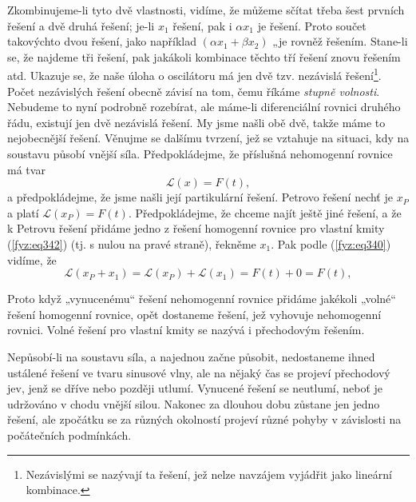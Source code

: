 {    
    Zkombinujeme-li tyto dvě vlastnosti, vidíme, že můžeme sčítat třeba šest prvních řešení a dvě 
    druhá řešení; je-li \(x_1\) řešení, pak i \(\alpha x_1\) je řešení. Proto součet takovýchto 
    dvou řešení, jako například \((\alpha x_1 + \beta x_2 )\) „je rovněž řešením. Stane-li se, že 
    najdeme tři řešení, pak jakákoli kombinace těchto tří řešení znovu řešením atd. Ukazuje se, že 
    naše úloha o oscilátoru má jen dvě tzv. nezávislá řešení\footnote{Nezávislými se nazývají ta 
    řešení, jež nelze navzájem vyjádřit jako lineární kombinace.}. Počet nezávislých řešení obecně 
    závisí na tom, čemu říkáme \emph{stupně volnosti}. Nebudeme to nyní podrobně rozebírat, ale 
    máme-li diferenciální rovnici druhého řádu, existují jen dvě nezávislá řešení. My jsme našli 
    obě dvě, takže máme to nejobecnější řešení. Věnujme se dalšímu tvrzení, jež se vztahuje na 
    situaci, kdy na soustavu působí vnější síla. Předpokládejme, že příslušná nehomogenní rovnice 
    má tvar
    \begin{equation}\label{fyz:eq343}
      \mathscr{L}(x) = F(t),
    \end{equation}
    a předpokládejme, že jsme našli její partikulární řešení. Petrovo řešení nechť je \(x_P\) a 
    platí \(\mathscr{L}(x_P) = F(t)\). Předpokládejme, že chceme najít ještě jiné řešení, a že k 
    Petrovu řešení přidáme jedno z řešení homogenní rovnice pro vlastní kmity (\ref{fyz:eq342}) 
    (tj. s nulou na pravé straně), řekněme \(x_1\). Pak podle (\ref{fyz:eq340}) vidíme, že
    \begin{equation}\label{fyz:eq344}
      \mathscr{L}(x_P + x_1) = \mathscr{L}(x_P) + \mathscr{L}(x_1) = F(t) + 0 = F(t),
    \end{equation}
    
    Proto když „vynucenému“ řešení nehomogenní rovnice přidáme jakékoli „volné“ řešení homogenní 
    rovnice, opět dostaneme řešení, jež vyhovuje nehomogenní rovnici. Volné řešení pro vlastní 
    kmity se nazývá i přechodovým řešením. 
    
    Nepůsobí-li na soustavu síla, a najednou začne působit, nedostaneme ihned ustálené řešení ve 
    tvaru sinusové vlny, ale na nějaký čas se projeví přechodový jev, jenž se dříve nebo později 
    utlumí. Vynucené řešení se neutlumí, neboť je udržováno v chodu vnější silou. Nakonec za 
    dlouhou dobu zůstane jen jedno řešení, ale zpočátku se za různých okolností projeví různé 
    pohyby v závislosti na počátečních podmínkách.
    
}
